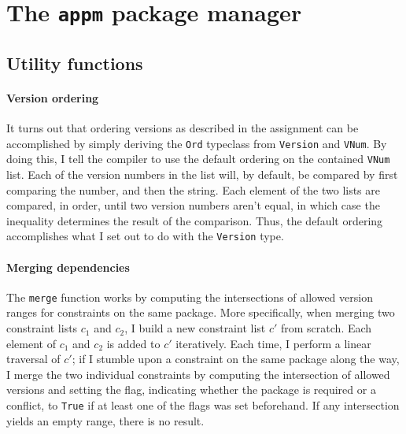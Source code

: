 \section*{The \texttt{appm} package manager}

\subsection*{Utility functions}
\paragraph{Version ordering}
It turns out that ordering versions as described in the assignment can be accomplished by simply deriving the \texttt{Ord} typeclass from \texttt{Version} and \texttt{VNum}. By doing this, I tell the compiler to use the default ordering on the contained \texttt{VNum} list. Each of the version numbers in the list will, by default, be compared by first comparing the number, and then the string. Each element of the two lists are compared, in order, until two version numbers aren't equal, in which case the inequality determines the result of the comparison. Thus, the default ordering accomplishes what I set out to do with the \texttt{Version} type.

%

\paragraph{Merging dependencies}
 The \texttt{merge} function works by computing the intersections of allowed version ranges for constraints on the same package. More specifically, when merging two constraint lists $c_1$ and $c_2$, I build a new constraint list $c'$ from scratch. Each element of $c_1$ and $c_2$ is added to $c'$ iteratively. Each time, I perform a linear traversal of $c'$; if I stumble upon a constraint on the same package along the way, I merge the two individual constraints by computing the intersection of allowed versions and setting the flag, indicating whether the package is required or a conflict, to \texttt{True} if at least one of the flags was set beforehand. If any intersection yields an empty range, there is no result.

